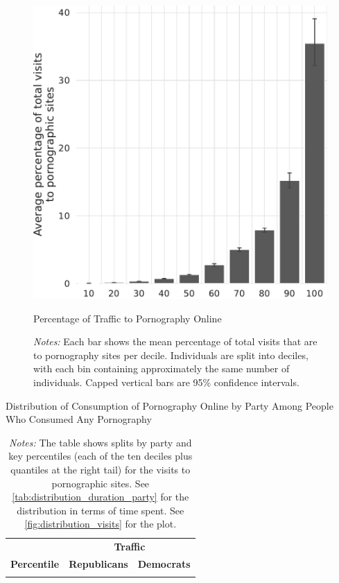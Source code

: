 \documentclass[12pt,twoside]{article}
\begin{document}
\begin{figure}
	\centering
	\includegraphics[width=.65\linewidth]{figs/distribution_proportion_visits_to_adultsites.pdf}
	\caption{Percentage of Traffic to Pornography Online}
	\caption*{\footnotesize \emph{Notes:} 
             Each bar shows the mean percentage of total visits that are to pornography sites per decile.
		Individuals are split into deciles, with each bin containing approximately the same number of individuals.
		Capped vertical bars are 95\% confidence intervals.
	}
	\label{fig:distribution_prop_visits}
\end{figure}


\begin{table}[ht] \centering \small \setlength\tabcolsep{10 pt}
	\caption{Distribution of Consumption of Pornography Online by Party Among People Who Consumed Any Pornography}
	\label{tab:distribution_visits_party}
	\begin{adjustbox}{max width=\textwidth}
		\begin{tabular}{crr}
			\toprule
			\multicolumn{1}{l}{\textbf{}}&\multicolumn{2}{c}{\textbf{Traffic}}\\
			\cmidrule(l){2-3}
			\multicolumn{1}{l}{\textbf{Percentile}}&\multicolumn{1}{c}{\textbf{Republicans}}&\multicolumn{1}{c}{\textbf{Democrats}}\\
			\midrule
            \\
			\bottomrule
		\end{tabular}
	\end{adjustbox}
	\caption*{\footnotesize \emph{Notes:} 
		The table shows splits by party and key percentiles (each of the ten deciles plus quantiles at the right tail) for the visits to pornographic sites.
		See \cref{tab:distribution_duration_party} for the distribution in terms of time spent. 
		See \cref{fig:distribution_visits} for the plot.
	}
\end{table}
\end{document}
